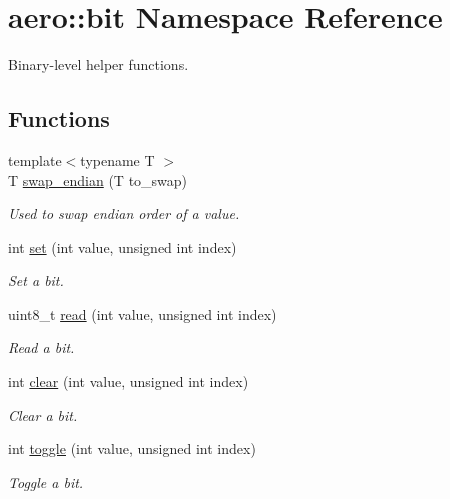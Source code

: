 \hypertarget{namespaceaero_1_1bit}{}\section{aero\+:\+:bit Namespace Reference}
\label{namespaceaero_1_1bit}


Binary-\/level helper functions.  


\subsection*{Functions}
\begin{DoxyCompactItemize}
\item 
{\footnotesize template$<$typename T $>$ }\\T \hyperlink{namespaceaero_1_1bit_a6353e436ee2a0a7ca0ad70469b93cee9}{swap\+\_\+endian} (T to\+\_\+swap)
\begin{DoxyCompactList}\small\item\em Used to swap endian order of a value. \end{DoxyCompactList}\item 
int \hyperlink{namespaceaero_1_1bit_a4ed6b0b921cdc3ddffb29fd68bbd78e6}{set} (int value, unsigned int index)
\begin{DoxyCompactList}\small\item\em Set a bit. \end{DoxyCompactList}\item 
uint8\+\_\+t \hyperlink{namespaceaero_1_1bit_a31644e92c2e3e0c49f7ac4e2088ab5d0}{read} (int value, unsigned int index)
\begin{DoxyCompactList}\small\item\em Read a bit. \end{DoxyCompactList}\item 
int \hyperlink{namespaceaero_1_1bit_a4eed338c347ab1ec13345717315fbf30}{clear} (int value, unsigned int index)
\begin{DoxyCompactList}\small\item\em Clear a bit. \end{DoxyCompactList}\item 
int \hyperlink{namespaceaero_1_1bit_aa4ee1ec3b1b61413fb2c4bc0a12ba106}{toggle} (int value, unsigned int index)
\begin{DoxyCompactList}\small\item\em Toggle a bit. \end{DoxyCompactList}\end{DoxyCompactItemize}


